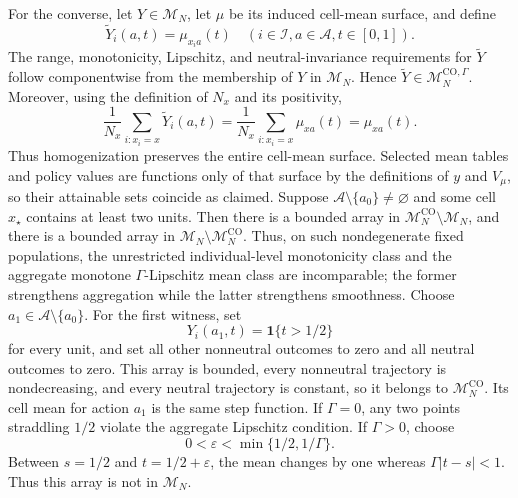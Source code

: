 For the converse, let \(Y\in\mathcal M_N\), let \(\mu\) be its induced cell-mean surface, and define
\[
\widetilde Y_i(a,t)=\mu_{x_i a}(t)
\quad(i\in\mathcal I, a\in\mathcal A, t\in[0,1]).
\]
The range, monotonicity, Lipschitz, and neutral-invariance requirements for \(\widetilde Y\) follow componentwise from the membership of \(Y\) in \(\mathcal M_N\).  Hence \(\widetilde Y\in\mathcal M_N^{\mathrm{CO},\Gamma}\).  Moreover, using the definition of \(N_x\) and its positivity,
\[
\frac1{N_x}\sum_{i:x_i=x}\widetilde Y_i(a,t)
=\frac1{N_x}\sum_{i:x_i=x}\mu_{xa}(t)
=\mu_{xa}(t).
\]
Thus homogenization preserves the entire cell-mean surface.  Selected mean tables and policy values are functions only of that surface by the definitions of \(y\) and \(V_\mu\), so their attainable sets coincide as claimed.
Suppose \(\mathcal A\setminus\{a_0\}\neq\varnothing\) and some cell \(x_\star\) contains at least two units.  Then there is a bounded array in \(\mathcal M_N^{\mathrm{CO}}\setminus\mathcal M_N\), and there is a bounded array in \(\mathcal M_N\setminus\mathcal M_N^{\mathrm{CO}}\).  Thus, on such nondegenerate fixed populations, the unrestricted individual-level monotonicity class and the aggregate monotone \(\Gamma\)-Lipschitz mean class are incomparable; the former strengthens aggregation while the latter strengthens smoothness.
Choose \(a_1\in\mathcal A\setminus\{a_0\}\).  For the first witness, set
\[
Y_i(a_1,t)=\mathbf 1\{t>1/2\}
\]
for every unit, and set all other nonneutral outcomes to zero and all neutral outcomes to zero.  This array is bounded, every nonneutral trajectory is nondecreasing, and every neutral trajectory is constant, so it belongs to \(\mathcal M_N^{\mathrm{CO}}\).  Its cell mean for action \(a_1\) is the same step function.  If \(\Gamma=0\), any two points straddling \(1/2\) violate the aggregate Lipschitz condition.  If \(\Gamma>0\), choose
\[
0<\varepsilon<\min\{1/2,1/\Gamma\}.
\]
Between \(s=1/2\) and \(t=1/2+\varepsilon\), the mean changes by one whereas \(\Gamma|t-s|<1\).  Thus this array is not in \(\mathcal M_N\).

